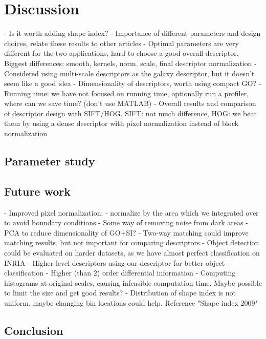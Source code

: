\documentclass[thesis.tex]{subfiles}
\begin{document}
\chapter{Discussion}

- Is it worth adding shape index?
- Importance of different parameters and design choices, relate these results to other articles
- Optimal parameters are very different for the two applications, hard to choose a good overall descriptor. Biggest differences: smooth, kernels, norm. scale, final descriptor normalization
- Considered using multi-scale descriptors as the galaxy descriptor, but it doesn't seem like a good idea
- Dimensionality of descriptors, worth using compact GO?
- Running time: we have not focused on running time, optionally run a profiler, where can we save time? (don't use MATLAB)
- Overall results and comparison of descriptor design with SIFT/HOG. SIFT: not much difference, HOG: we beat them by using a dense descriptor with pixel normalization instead of block normalization

\section{Parameter study}


\section{Future work}
- Improved pixel normalization:
	- normalize by the area which we integrated over to avoid boundary conditions
	- Some way of removing noise from dark areas
- PCA to reduce dimensionality of GO+SI?
- Two-way matching could improve matching results, but not important for comparing descriptors
- Object detection could be evaluated on harder datasets, as we have almost perfect classification on INRIA
- Higher level descriptors using our descriptor for better object classification
- Higher (than 2) order differential information
- Computing histograms at original scales, causing infeasible computation time. Maybe possible to limit the size and get good results?
- Distribution of shape index is not uniform, maybe changing bin locations could help. Reference "Shape index 2009"

\section{Conclusion}

\subbibliography
\end{document}
